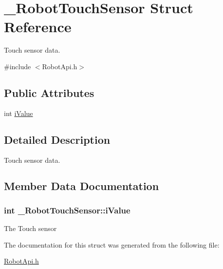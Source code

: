 \hypertarget{struct__RobotTouchSensor}{\section{\+\_\+\+Robot\+Touch\+Sensor Struct Reference}
\label{struct__RobotTouchSensor}
}


Touch sensor data.  




{\ttfamily \#include $<$Robot\+Api.\+h$>$}

\subsection*{Public Attributes}
\begin{DoxyCompactItemize}
\item 
int \hyperlink{struct__RobotTouchSensor_add5e6cd8bce6fb09abbfd6c3f09a3faa}{i\+Value}
\end{DoxyCompactItemize}


\subsection{Detailed Description}
Touch sensor data. 

\subsection{Member Data Documentation}
\hypertarget{struct__RobotTouchSensor_add5e6cd8bce6fb09abbfd6c3f09a3faa}{
\subsubsection[{i\+Value}]{\setlength{\rightskip}{0pt plus 5cm}int \+\_\+\+Robot\+Touch\+Sensor\+::i\+Value}}\label{struct__RobotTouchSensor_add5e6cd8bce6fb09abbfd6c3f09a3faa}
The Touch sensor 

The documentation for this struct was generated from the following file\+:\begin{DoxyCompactItemize}
\item 
\hyperlink{RobotApi_8h}{Robot\+Api.\+h}\end{DoxyCompactItemize}
